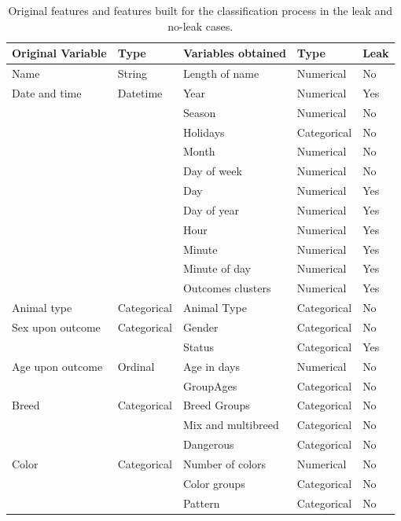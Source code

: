 \documentclass[a4paper,11pt]{article}
\begin{document}
\begin{table}[t]
\centering
\begin{tabular}{@{}lllll@{}}
\toprule
Original Variable & Type        & Variables obtained & Type        & Leak \\ \midrule
Name             & String      & Length of name     & Numerical   & No   \\
Date and time    & Datetime    & Year               & Numerical   & Yes  \\
                 &             & Season             & Numerical   & No   \\
                 &			   & Holidays			& Categorical & No \\
                 &             & Month              & Numerical   & No   \\
                 &             & Day of week        & Numerical   & No   \\
                 &             & Day                & Numerical   & Yes  \\
                 &             & Day of year        & Numerical   & Yes  \\
                 &             & Hour               & Numerical   & Yes  \\
                 &             & Minute             & Numerical   & Yes  \\
                 &             & Minute of day      & Numerical   & Yes  \\
                 &             & Outcomes clusters  & Numerical   & Yes  \\
Animal type      & Categorical & Animal Type        & Categorical & No   \\
Sex upon outcome & Categorical & Gender             & Categorical & No   \\
                 &             & Status             & Categorical & Yes  \\
Age upon outcome & Ordinal     & Age in days        & Numerical   & No   \\
		&	   & GroupAges		& Categorical & No\\
Breed            & Categorical & Breed Groups       & Categorical & No   \\
                 &             & Mix and multibreed & Categorical & No   \\
                 &             & Dangerous          & Categorical & No   \\
Color            & Categorical & Number of colors   & Numerical   & No   \\
                 &             & Color groups       & Categorical & No   \\
                 &             & Pattern            & Categorical & No   \\ \bottomrule
\end{tabular}
\caption{Original features and features built for the classification process in the leak and no-leak cases.}
\label{tab:features}
\end{table}
\end{document}
